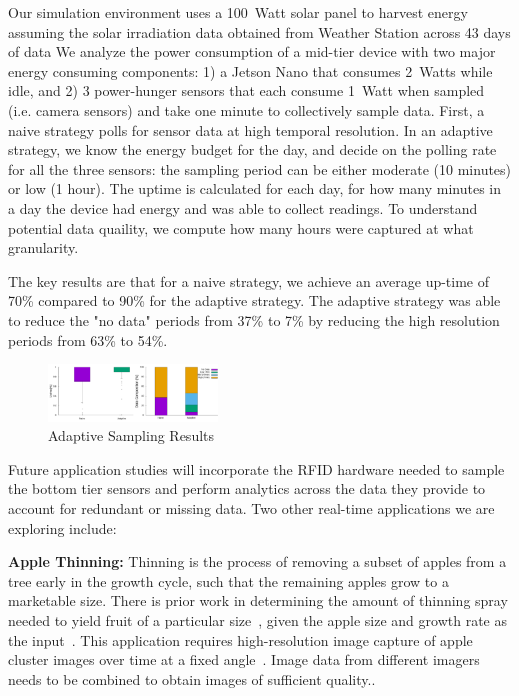 Our simulation environment uses a 100~Watt solar panel to harvest energy assuming the solar irradiation data obtained from Weather Station across 43 days of data  We analyze the power consumption of a mid-tier device with two major energy consuming components: 1) a Jetson Nano that consumes 2~Watts while idle, and 2) 3 power-hunger sensors that each consume 1~Watt when sampled (i.e. camera sensors) and take one minute to collectively sample data. First, a naive strategy polls for sensor data at high temporal resolution. In an adaptive strategy, we know the energy budget for the day, and decide on the polling rate for all the three sensors: the sampling period can be either moderate (10 minutes) or low (1 hour). The uptime is calculated for each day, for how many minutes in a day the device had energy and was able to collect readings. To understand potential data quaility, we compute how many hours were captured at what granularity.  

The key results are that for a naive strategy, we achieve an average up-time of 70\% compared to 90\% for the adaptive strategy. The adaptive strategy was able to reduce the "no data" periods from 37\% to 7\% by reducing the high resolution periods from 63\% to 54\%. 

\begin{figure}[t]
\centering
\includegraphics[width=0.4\textwidth]{./figures/combined.pdf}
\caption{Adaptive Sampling Results}
\label{fig:adaptive-sampling}
\end{figure}

Future application studies will incorporate the RFID hardware needed to sample the bottom tier sensors and perform analytics across the data they provide to account for redundant or missing data. Two other real-time applications we are exploring include:

 \noindent\textbf{Apple Thinning:} Thinning is the process of removing a subset of apples from a tree early in the growth cycle, such that the remaining apples grow to a marketable size. There is prior work in determining the amount of thinning spray needed to yield fruit of a particular size~\cite{thinning-history}, given the apple size and growth rate as the input~\cite{fruitlet-model}. This application requires high-resolution image capture of apple cluster images over time at a fixed angle~\cite{yield-prediction, crop-estimation}. Image data from different imagers needs to be combined to obtain images of sufficient quality.. 
     
